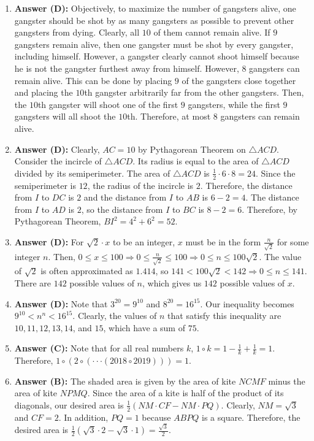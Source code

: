 \documentclass{article}
\begin{document}
\begin{enumerate}
\item \textbf{Answer (D):} Objectively, to maximize the number of gangsters alive, one gangster should be shot by as many gangsters as possible to prevent other gangsters from dying. Clearly, all $10$ of them cannot remain alive. If $9$ gangsters remain alive, then one gangster must be shot by every gangster, including himself. However, a gangster clearly cannot shoot himself because he is not the gangster furthest away from himself. However, $8$ gangsters can remain alive. This can be done by placing $9$ of the gangsters close together and placing the $10$th gangster arbitrarily far from the other gangsters. Then, the $10$th gangster will shoot one of the first $9$ gangsters, while the first $9$ gangsters will all shoot the $10$th. Therefore, at most $8$ gangsters can remain alive.

\item \textbf{Answer (D):} Clearly, $AC=10$ by Pythagorean Theorem on $\triangle ACD$. Consider the incircle of $\triangle ACD$. Its radius is equal to the area of $\triangle ACD$ divided by its semiperimeter. The area of $\triangle ACD$ is $\frac{1}{2}\cdot6\cdot8=24$. Since the semiperimeter is $12$, the radius of the incircle is $2$. Therefore, the distance from $I$ to $DC$ is $2$ and the distance from $I$ to $AB$ is $6-2=4$. The distance from $I$ to $AD$ is $2$, so the distance from $I$ to $BC$ is $8-2=6$. Therefore, by Pythagorean Theorem, $BI^{2}=4^{2}+6^{2}=52$.

\item \textbf{Answer (D):} For $\sqrt{2}\cdot x$ to be an integer, $x$ must be in the form $\frac{n}{\sqrt{2}}$ for some integer $n$. Then, $0\le x\le100\Rightarrow0\le\frac{n}{\sqrt{2}}\le100\Rightarrow0\le n\le100\sqrt{2}$. The value of $\sqrt{2}$ is often approximated as $1.414$, so $141<100\sqrt{2}<142\Rightarrow0\le n\le141$. There are $142$ possible values of $n$, which gives us $142$ possible values of $x$.

\item \textbf{Answer (D):} Note that $3^{20}=9^{10}$ and $8^{20}=16^{15}$. Our inequality becomes $9^{10}<n^{n}<16^{15}$. Clearly, the values of $n$ that satisfy this inequality are $10, 11, 12, 13, 14$, and $15$, which have a sum of $75$.

\item \textbf{Answer (C):} Note that for all real numbers $k$, $1\circ k=1-\frac{1}{k}+\frac{1}{k}=1$. Therefore, $1\circ(2\circ(\cdot\cdot\cdot(2018\circ2019)))=1$.

\item \textbf{Answer (B):} The shaded area is given by the area of kite $NCMF$ minus the area of kite $NPMQ$. Since the area of a kite is half of the product of its diagonals, our desired area is $\frac{1}{2}(NM\cdot CF-NM\cdot PQ)$. Clearly, $NM=\sqrt{3}$ and $CF=2$. In addition, $PQ=1$ because $ABPQ$ is a square. Therefore, the desired area is $\frac{1}{2}(\sqrt{3}\cdot2-\sqrt{3}\cdot1)=\frac{\sqrt{3}}{2}$.


\end{enumerate}
\end{document}
